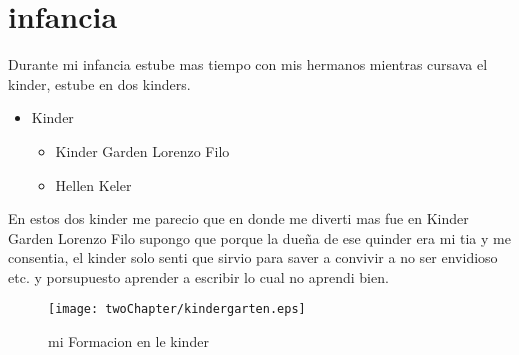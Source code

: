 \chapter{infancia}
Durante mi infancia estube mas tiempo con mis hermanos mientras cursava el kinder, estube en dos kinders.
\begin{itemize}
	\item Kinder
		\begin{itemize}
			\item	Kinder Garden Lorenzo Filo
			\item   Hellen Keler
		\end{itemize}
\end{itemize}

En estos dos kinder me parecio que en donde me diverti mas fue en Kinder Garden Lorenzo Filo supongo que porque la dueña de ese quinder era mi tia y me consentia, el kinder solo senti que sirvio para saver a convivir a no ser envidioso etc. y porsupuesto aprender a escribir lo cual no aprendi bien.

\begin{figure}[H]
\centering
\texttt{[image: twoChapter/kindergarten.eps]}
\caption{mi Formacion en le kinder}
\label{Kinder}
\end{figure}
